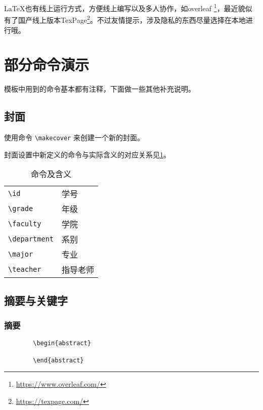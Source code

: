 \documentclass{hainanuthesis}
\theoremstyle{definition}
\begin{document}
	\LaTeX 也有线上运行方式，方便线上编写以及多人协作，如overleaf \footnote{\href{https://www.overleaf.com/}{https://www.overleaf.com/}}，最近貌似有了国产线上版本TexPage\footnote{\href{https://texpage.com/}{https://texpage.com/}}。不过友情提示，涉及隐私的东西尽量选择在本地进行哦。
	
	\section{部分命令演示}
	
	模板中用到的命令基本都有注释，下面做一些其他补充说明。
	\subsection{封面}
	
	使用命令
	\verb|\makecover|
	来创建一个新的封面。
	
	封面设置中新定义的命令与实际含义的对应关系见\cref{tb:02}。
	
	\begin{table}[!htbp]
		\begin{center}
			\caption{命令及含义}
			\label{tb:02}
			\begin{tabular}{ll}
				\verb|\id|         & 学号     \\
				\verb|\grade|      & 年级     \\
				\verb|\faculty|    & 学院     \\
				\verb|\department| & 系别     \\
				\verb|\major|      & 专业     \\
				\verb|\teacher|    & 指导老师 \\
			\end{tabular}
		\end{center}
	\end{table}
	
	\subsection{摘要与关键字}
	
	\subsubsection{摘要}
	\begin{verbatim}
		\begin{abstract}
			
		\end{abstract}
	\end{verbatim}
	
\end{document}
